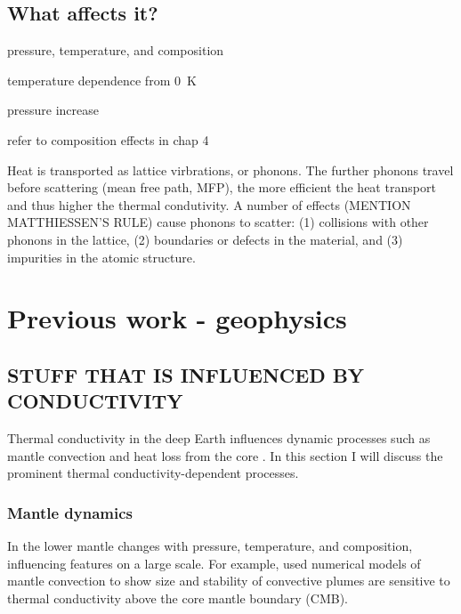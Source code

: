 \subsection{What affects it?}
pressure, temperature, and composition

temperature dependence from 0~K

pressure increase

refer to composition effects in chap 4

Heat is transported as lattice virbrations, or phonons. The further phonons travel before scattering (mean free path, MFP), the more efficient the heat transport and thus higher the thermal condutivity. A number of effects (MENTION MATTHIESSEN'S RULE) cause phonons to scatter: (1) collisions with other phonons in the lattice, (2) boundaries or defects in the material, and (3) impurities in the atomic structure. 



\section{Previous work - geophysics}

\subsection{STUFF THAT IS INFLUENCED BY CONDUCTIVITY}
\label{sec:ch1:cond_in_earth}

Thermal conductivity in the deep Earth influences dynamic processes such as mantle convection and heat loss from the core \citep{Lay2008}. In this section I will discuss the prominent thermal conductivity-dependent processes.

\subsubsection{Mantle dynamics}

In the lower mantle \tcs changes with pressure, temperature, and composition, influencing features on a large scale. For example, \citet{Naliboff2006} used numerical models of mantle convection to show size and stability of convective plumes are sensitive to thermal conductivity above the core mantle boundary (CMB).

